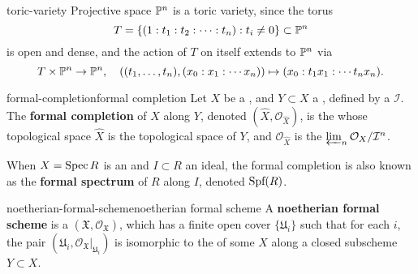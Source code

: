\begin{example}{toric-variety}
    Projective space $\mathbb{P}^n$ is a toric variety, since the torus
    \[ T = \{ (1 : t_1 : t_2 : \cdots : t_n) : t_i \ne 0 \} \subset \mathbb{P}^n \]
    is open and dense, and the action of $T$ on itself extends to $\mathbb{P}^n$ via
    \[ T \times \mathbb{P}^n \to \mathbb{P}^n, \quad \left( (t_1, \ldots, t_n), (x_0 : x_1 : \cdots x_n) \right) \mapsto (x_0 : t_1 x_1 : \cdots t_n x_n) . \]
\end{example}

\begin{topic}{formal-completion}{formal completion}
    Let $X$ be a  , and $Y \subset X$ a , defined by a  $\mathcal{I}$. The \textbf{formal completion} of $X$ along $Y$, denoted $(\hat{X}, \mathcal{O}_{\hat{X}})$, is the  whose topological space $\hat{X}$ is the topological space of $Y$, and $\mathcal{O}_{\hat{X}}$ is the  $\varprojlim_n \mathcal{O}_X / \mathcal{I}^n$.
    
    When $X = \operatorname{Spec} R$ is an  and $I \subset R$ an ideal, the formal completion is also known as the \textbf{formal spectrum} of $R$ along $I$, denoted $\textup{Spf}(R)$.
\end{topic}

\begin{topic}{noetherian-formal-scheme}{noetherian formal scheme}
    A \textbf{noetherian formal scheme} is a  $(\mathfrak{X}, \mathcal{O}_\mathfrak{X})$, which has a finite open cover $\{ \mathfrak{U}_i \}$ such that for each $i$, the pair $(\mathfrak{U}_i, \mathcal{O}_\mathfrak{X}|_{\mathfrak{U}_i})$ is isomorphic to the  of some  $X$ along a closed subscheme $Y \subset X$.
\end{topic}

